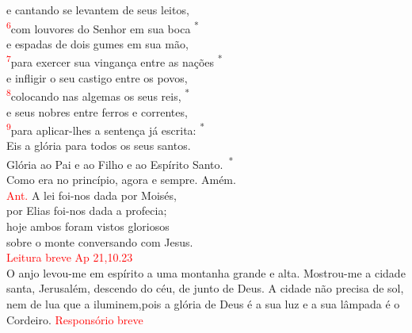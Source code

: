 \documentclass{book}
\begin{document}
\begin{center}
    e cantando se levantem de seus leitos, \\
    \textsuperscript{\underline{\hspace{.06in}}\textcolor{red}{6}}com louvores do Senhor em sua boca \textsuperscript{*} \\
    e espadas de dois gumes em sua mão,
    \vspace{.2cm} \\
    \textsuperscript{\underline{\hspace{.06in}}\textcolor{red}{7}}para exercer sua vingança entre as nações \textsuperscript{*} \\
    e infligir o seu castigo entre os povos, \\
    \textsuperscript{\underline{\hspace{.06in}}\textcolor{red}{8}}colocando nas algemas os seus reis, \textsuperscript{*} \\
    e seus nobres entre ferros e correntes, \\
    \textsuperscript{\underline{\hspace{.06in}}\textcolor{red}{9}}para aplicar-lhes a sentença já escrita: \textsuperscript{*} \\
    Eis a glória para todos os seus santos.
    \vspace{.2cm} \\
    \textsuperscript{\underline{\hspace{.06in}}} Glória ao Pai e ao Filho e ao Espírito Santo.\ \textsuperscript{*} \\
    Como era no princípio, agora e sempre. Amém.
    \vspace{.2cm} \\
    \textcolor{red}{Ant.} A lei foi-nos dada por Moisés, \\
    por Elias foi-nos dada a profecia; \\
    hoje ambos foram vistos gloriosos \\
    sobre o monte conversando com Jesus.
    \vspace{.2cm} \\
    \textcolor{red}{Leitura breve Ap 21,10.23}
    \vspace{.2cm} \\
    O anjo levou-me em espírito a uma montanha grande e alta. Mostrou-me a cidade santa, Jerusalém, descendo do céu, de junto de Deus. A cidade não precisa de sol, nem de lua que a iluminem,pois a glória de Deus é a sua luz e a sua lâmpada é o Cordeiro.
    \newpage
    \textcolor{red}{Responsório breve}
    \vspace{.2cm} \\

\end{center}
\end{document}
